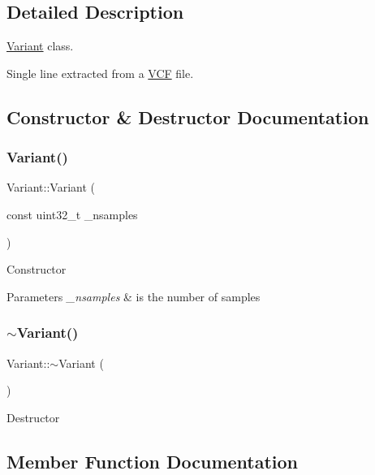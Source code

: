 \subsection{Detailed Description}
\mbox{\hyperlink{classVariant}{Variant}} class. 

Single line extracted from a \mbox{\hyperlink{classVCF}{V\+CF}} file. 

\subsection{Constructor \& Destructor Documentation}
\mbox{\label{classVariant_a4019e075040ef2a36ac73d86d01ace70}} 
\subsubsection{\texorpdfstring{Variant()}{Variant()}}
{\footnotesize\ttfamily Variant\+::\+Variant (\begin{DoxyParamCaption}\item[{const uint32\+\_\+t}]{\+\_\+nsamples }\end{DoxyParamCaption})\hspace{0.3cm}{\ttfamily [inline]}}

Constructor


\begin{DoxyParams}{Parameters}
{\em \+\_\+nsamples} & is the number of samples \\
\hline
\end{DoxyParams}
\mbox{\label{classVariant_afefce84ee3f94c9154c69e2e9a62f0b0}} 
\subsubsection{\texorpdfstring{$\sim$Variant()}{~Variant()}}
{\footnotesize\ttfamily Variant\+::$\sim$\+Variant (\begin{DoxyParamCaption}{ }\end{DoxyParamCaption})\hspace{0.3cm}{\ttfamily [inline]}}

Destructor 

\subsection{Member Function Documentation}
\mbox{\label{classVariant_a9b58c112529f33a075d709599d639810}} 
